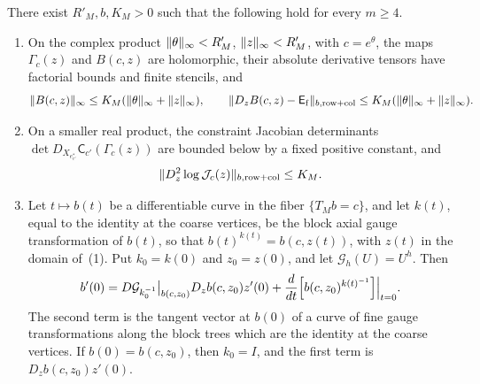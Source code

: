\begin{lemma}\label{ch07:lem:shell-branch}
There exist $R'_M,b,K_M>0$ such that the following hold for every $m\ge4$.
\begin{enumerate}
\item On the complex product $\lVert \theta\rVert_\infty<R'_M$, $\lVert z\rVert_\infty<R'_M$, with $c=e^\theta$, the maps $\Gamma_c(z)$ and $B(c,z)$ are holomorphic, their absolute derivative tensors have factorial bounds and finite stencils, and
\[
 \lVert B(c,z)\rVert_\infty\le K_M(\lVert \theta\rVert_\infty+\lVert z\rVert_\infty),\qquad
 \lVert D_zB(c,z)-\mathsf E_{\mathrm f}\rVert_{b,\mathrm{row+col}}\le K_M(\lVert \theta\rVert_\infty+\lVert z\rVert_\infty).
\]
\item On a smaller real product, the constraint Jacobian determinants $\det D_{X_{e^*_{c'}}}\mathsf C_{c'}(\Gamma_c(z))$ are bounded below by a fixed positive constant, and
\[
 \lVert D_z^2\log\mathcal J_c(z)\rVert_{b,\mathrm{row+col}}\le K_M .
\]
\item Let $t\mapsto b(t)$ be a differentiable curve in the fiber $\{T_Mb=c\}$, and let $k(t)$, equal to the identity at the coarse vertices, be the block axial gauge transformation of $b(t)$, so that $b(t)^{k(t)}=b(c,z(t))$, with $z(t)$ in the domain of~(1). Put $k_0=k(0)$ and $z_0=z(0)$, and let $\mathcal G_h(U)=U^h$. Then
\[
 b'(0)=D\mathcal G_{k_0^{-1}}\big|_{b(c,z_0)}D_zb(c,z_0)z'(0)+\frac d{dt}\Bigl[b(c,z_0)^{k(t)^{-1}}\Bigr]\Big|_{t=0}.
\]
The second term is the tangent vector at $b(0)$ of a curve of fine gauge transformations along the block trees which are the identity at the coarse vertices. If $b(0)=b(c,z_0)$, then $k_0=I$, and the first term is $D_zb(c,z_0)z'(0)$.
\end{enumerate}
\end{lemma}

